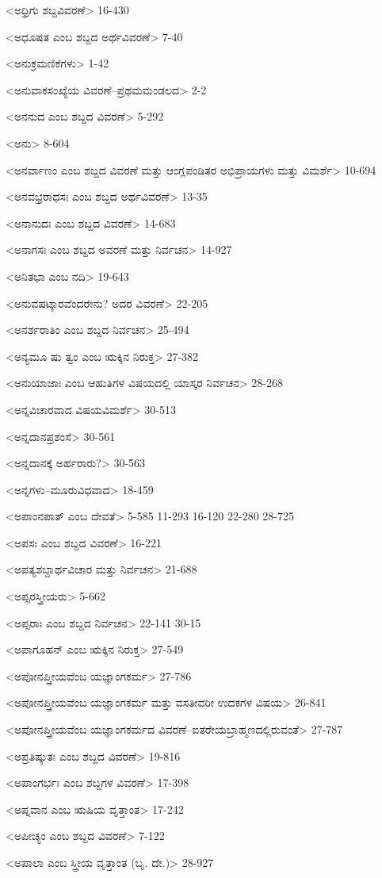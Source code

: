 <ಅಧ್ರಿಗು ಶಬ್ದವಿವರಣೆ>
16-430

<ಅಧೂಷತ ಎಂಬ ಶಬ್ದದ ಅರ್ಥವಿವರಣೆ>
7-40

<ಅನುಕ್ರಮಣಿಕೆಗಳು>
1-42

<ಅನುವಾಕಸಂಖ್ಯೆಯ ವಿವರಣೆ–ಪ್ರಥಮಮಂಡಲದ>
2-2

<ಅನನುದ ಎಂಬ ಶಬ್ದದ ವಿವರಣೆ>
5-292

<ಅನು>
8-604

<ಅನರ್ವಾಣಂ ಎಂಬ ಶಬ್ದದ ವಿವರಣೆ ಮತ್ತು ಆಂಗ್ಲಪಂಡಿತರ ಅಭಿಪ್ರಾಯಗಳು ಮತ್ತು ವಿಮರ್ಶೆ>
10-694

<ಅನವಭ್ರರಾಧಸಃ ಎಂಬ ಶಬ್ದದ ಅರ್ಥವಿವರಣೆ>
13-35

<ಅನಾನುದಃ ಎಂಬ ಶಬ್ದದ ವಿವರಣೆ>
14-683

<ಅನಾಗಸಃ ಎಂಬ ಶಬ್ದದ ಅವರಣೆ ಮತ್ತು ನಿರ್ವಚನ>
14-927

<ಅನಿತಭಾ ಎಂಬ ನದಿ>
19-643

<ಅನುವಷಟ್ಕಾರವೆಂದರೇನು? ಅದರ ವಿವರಣೆ>
22-205

<ಅನರ್ಶರಾತಿಂ ಎಂಬ ಶಬ್ದದ ನಿರ್ವಚನ>
25-494

<ಅನ್ಯಮೂ ಷು ತ್ವಂ ಎಂಬ ಋಕ್ಕಿನ ನಿರುಕ್ತ>
27-382

<ಅನುಯಾಜಾಃ ಎಂಬ ಆಹುತಿಗಳ ವಿಷಯದಲ್ಲಿ ಯಾಸ್ಕರ ನಿರ್ವಚನ>
28-268

<ಅನ್ನವಿಚಾರವಾದ ವಿಷಯವಿಮರ್ಶೆ>
30-513

<ಅನ್ನದಾನಪ್ರಶಂಸೆ>
30-561

<ಅನ್ನದಾನಕ್ಕೆ ಅರ್ಹರಾರು?>
30-563

<ಅನ್ನಗಳು–ಮೂರುವಿಧವಾದ>
18-459

<ಅಪಾಂನಪಾತ್‍ ಎಂಬ ದೇವತೆ>
5-585
11-293 
16-120
22-280
28-725

<ಅಪಸಃ ಎಂಬ ಶಬ್ದದ ವಿವರಣೆ>
16-221

<ಅಪತ್ಯಶಬ್ದಾರ್ಥವಿಚಾರ ಮತ್ತು ನಿರ್ವಚನ>
21-688

<ಅಪ್ಸರಸ್ತ್ರೀಯರು>
5-662

<ಅಪ್ಸರಾಃ ಎಂಬ ಶಬ್ದದ ನಿರ್ವಚನ>
22-141 
30-15

<ಅಪಾಗೂಹನ್‍ ಎಂಬ ಋಕ್ಕಿನ ನಿರುಕ್ತ>
27-549

<ಅಪೋನಪ್ತ್ರೀಯವೆಂಬ ಯಜ್ಞಾಂಗಕರ್ಮ>
27-786

<ಅಪೋನಪ್ತ್ರೀಯವೆಂಬ ಯಜ್ಞಾಂಗಕರ್ಮ ಮತ್ತು ವಸತೀವರೀ ಉದಕಗಳ ವಿಷಯ>
26-841

<ಅಪೋನಪ್ತ್ರೀಯವೆಂಬ ಯಜ್ಞಾಂಗಕರ್ಮದ ವಿವರಣೆ–ಐತರೇಯಬ್ರಾಹ್ಮಣದಲ್ಲಿರುವಂತೆ>
27-787

<ಅಪ್ರತಿಷ್ಕುತಃ ಎಂಬ ಶಬ್ದದ ವಿವರಣೆ>
19-816

<ಅಪಾಂಗರ್ಭಃ ಎಂಬ ಶಬ್ದಗಳ ವಿವರಣೆ>
17-398

<ಅಪ್ನವಾನ ಎಂಬ ಋಷಿಯ ವೃತ್ತಾಂತ>
17-242

<ಅಪೀಚ್ಯಂ ಎಂಬ ಶಬ್ದದ ವಿವರಣೆ>
7-122

<ಅಪಾಲಾ ಎಂಬ ಸ್ತ್ರೀಯ ವೃತ್ತಾಂತ (ಬೃ. ದೇ.)>
28-927

